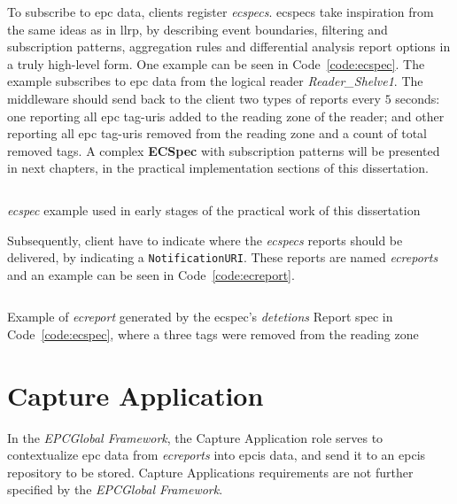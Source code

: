 To subscribe to \ac{epc} data, clients register \emph{\acp{ecspec}}. 
\acp{ecspec} take inspiration from the same ideas as in \ac{llrp}, by describing event boundaries, filtering and subscription patterns, aggregation rules and differential analysis report options in a truly high-level form.
One example can be seen in Code~\ref{code:ecspec}. The example subscribes to \ac{epc} data from the logical reader \textit{Reader\_Shelve1}. The middleware should send back to the client two types of reports every $5$ seconds: one reporting all \ac{epc} tag-\acp{uri} added to the reading zone of the reader; and other reporting all \ac{epc} tag-\acp{uri} removed from the reading zone and a count of total removed tags.
A complex \textbf{ECSpec} with subscription patterns will be presented in next chapters, in the practical implementation sections of this dissertation.

\begin{listing}
    \inputminted[linenos, breaklines]{xml}{./code/sota/ECSpec.xml}
    \caption[\emph{\ac{ecspec}} example]{\emph{\ac{ecspec}} example used in early stages of the practical work of this dissertation}
    \label{code:ecspec}
\end{listing}

Subsequently, client have to indicate where the \emph{\acp{ecspec}} reports should be delivered, by indicating a \texttt{NotificationURI}.
These reports are named \emph{\acp{ecreport}} and an example can be seen in Code~\ref{code:ecreport}.

\begin{listing}
    \inputminted[linenos, breaklines]{xml}{./code/sota/EC_REPORT_deletions.xml}
    \caption[Example of \emph{\ac{ecreport}}]{Example of \emph{\ac{ecreport}} generated by the \ac{ecspec}'s \textit{detetions} Report \ac{spec} in Code~\ref{code:ecspec}, where a three tags were removed from the reading zone}
    \label{code:ecreport}
\end{listing}

\section{Capture Application}

In the \emph{EPCGlobal Framework}, the Capture Application role serves to contextualize \ac{epc} data from \emph{\acp{ecreport}} into \ac{epcis} data, and send it to an \ac{epcis} repository to be stored.
Capture Applications requirements are not further specified by the \emph{EPCGlobal Framework}.

